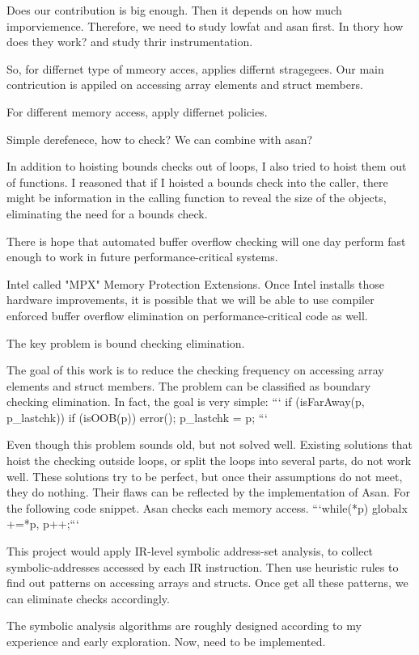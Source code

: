 


Does our contribution is big enough.
Then it depends on how much imporviemence. Therefore, we need to study lowfat and asan first.
In thory how does they work? and study thrir instrumentation.

So, for differnet type of mmeory acces, applies differnt stragegees.
Our main contricution is appiled on accessing array elements and struct members.


For different memory access, apply differnet policies.


Simple derefenece, how to check? We can combine with asan?




In addition to hoisting bounds checks out of loops, I also tried to hoist them out of functions. I reasoned that if I hoisted a bounds check into the caller, there might be information in the calling function to reveal the size of the objects, eliminating the need for a bounds check.


There is hope that automated buffer overflow checking will one day perform fast enough to work in future performance-critical systems.


Intel called "MPX" Memory Protection Extensions. Once Intel installs those hardware improvements, it is possible that we will be able to use compiler enforced buffer overflow elimination on performance-critical code as well.

The key problem is bound checking elimination.


The goal of this work is to reduce the checking frequency on accessing array elements and struct members.
The problem can be classified as boundary checking elimination. In fact, the goal is very simple:
```
if (isFarAway(p, p_lastchk)) {
    if (isOOB(p)) error();
    p_lastchk = p;
  }
```

Even though this problem sounds old, but not solved well.
Existing solutions that hoist the checking outside loops, or split the loops into several parts, do not work well.
These solutions try to be perfect, but once their assumptions do not meet, they do nothing.
Their flaws can be reflected by the implementation of Asan.
For the following code snippet. Asan checks each memory access.
```while(*p) {globalx +=*p, p++;}```

This project would apply IR-level symbolic address-set analysis, to collect symbolic-addresses accessed by each IR instruction.
Then use heuristic rules to find out patterns on accessing arrays and structs.
Once get all these patterns, we can eliminate checks accordingly.

The symbolic analysis algorithms are roughly designed according to my experience and early exploration.
Now, need to be implemented.


